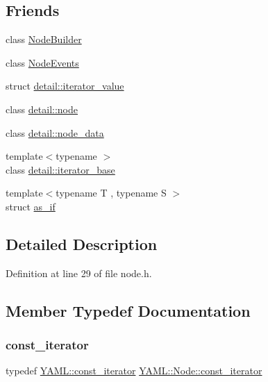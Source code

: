 \subsection*{Friends}
\begin{DoxyCompactItemize}
\item 
class \mbox{\hyperlink{class_y_a_m_l_1_1_node_a3698ada19fa4946ec1b589a2b23e695f}{Node\+Builder}}
\item 
class \mbox{\hyperlink{class_y_a_m_l_1_1_node_a499f933f221a93e5f5fe7f1a18f8f25b}{Node\+Events}}
\item 
struct \mbox{\hyperlink{class_y_a_m_l_1_1_node_accc6b154ee40bff3b5acc6db8015a8c6}{detail\+::iterator\+\_\+value}}
\item 
class \mbox{\hyperlink{class_y_a_m_l_1_1_node_abb1f10f2e479de89a0809c3e7f8fac9b}{detail\+::node}}
\item 
class \mbox{\hyperlink{class_y_a_m_l_1_1_node_a21fe8a2c1cad43a713578f42e65878d6}{detail\+::node\+\_\+data}}
\item 
{\footnotesize template$<$typename $>$ }\\class \mbox{\hyperlink{class_y_a_m_l_1_1_node_a95513f553864beda7d559428085c05f9}{detail\+::iterator\+\_\+base}}
\item 
{\footnotesize template$<$typename T , typename S $>$ }\\struct \mbox{\hyperlink{class_y_a_m_l_1_1_node_aa5bd1397d82d2b3c48bbc0a5557de43f}{as\+\_\+if}}
\end{DoxyCompactItemize}


\subsection{Detailed Description}


Definition at line 29 of file node.\+h.



\subsection{Member Typedef Documentation}
\mbox{\label{class_y_a_m_l_1_1_node_a40d235ac56001961929189a33c923d6c}} 
\subsubsection{\texorpdfstring{const\_iterator}{const\_iterator}}
{\footnotesize\ttfamily typedef \mbox{\hyperlink{namespace_y_a_m_l_a0a1f3211b4b1f42bb8e6a9fde49b5c44}{Y\+A\+M\+L\+::const\+\_\+iterator}} \mbox{\hyperlink{class_y_a_m_l_1_1_node_a40d235ac56001961929189a33c923d6c}{Y\+A\+M\+L\+::\+Node\+::const\+\_\+iterator}}}



